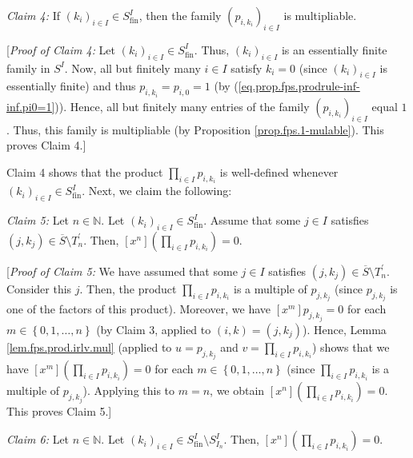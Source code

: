\begin{statement}
\textit{Claim 4:} If $\left(  k_{i}\right)  _{i\in I}\in
S_{\operatorname*{fin}}^{I}$, then the family $\left(  p_{i,k_{i}}\right)
_{i\in I}$ is multipliable.
\end{statement}

[\textit{Proof of Claim 4:} Let $\left(  k_{i}\right)  _{i\in I}\in
S_{\operatorname*{fin}}^{I}$. Thus, $\left(  k_{i}\right)  _{i\in I}$ is an
essentially finite family in $S^{I}$. Now, all but finitely many $i\in I$
satisfy $k_{i}=0$ (since $\left(  k_{i}\right)  _{i\in I}$ is essentially
finite) and thus $p_{i,k_{i}}=p_{i,0}=1$ (by
(\ref{eq.prop.fps.prodrule-inf-inf.pi0=1})). Hence, all but finitely many
entries of the family $\left(  p_{i,k_{i}}\right)  _{i\in I}$ equal $1$. Thus,
this family is multipliable (by Proposition \ref{prop.fps.1-mulable}). This
proves Claim 4.]

Claim 4 shows that the product $\prod_{i\in I}p_{i,k_{i}}$ is well-defined
whenever $\left(  k_{i}\right)  _{i\in I}\in S_{\operatorname*{fin}}^{I}$.
Next, we claim the following:

\begin{statement}
\textit{Claim 5:} Let $n\in\mathbb{N}$. Let $\left(  k_{i}\right)  _{i\in
I}\in S_{\operatorname*{fin}}^{I}$. Assume that some $j\in I$ satisfies
$\left(  j,k_{j}\right)  \in\overline{S}\setminus T_{n}^{\prime}$. Then,
$\left[  x^{n}\right]  \left(  \prod_{i\in I}p_{i,k_{i}}\right)  =0$.
\end{statement}

[\textit{Proof of Claim 5:} We have assumed that some $j\in I$ satisfies
$\left(  j,k_{j}\right)  \in\overline{S}\setminus T_{n}^{\prime}$. Consider
this $j$. Then, the product $\prod_{i\in I}p_{i,k_{i}}$ is a multiple of
$p_{j,k_{j}}$ (since $p_{j,k_{j}}$ is one of the factors of this product).
Moreover, we have $\left[  x^{m}\right]  p_{j,k_{j}}=0$ for each $m\in\left\{
0,1,\ldots,n\right\}  $ (by Claim 3, applied to $\left(  i,k\right)  =\left(
j,k_{j}\right)  $). Hence, Lemma \ref{lem.fps.prod.irlv.mul} (applied to
$u=p_{j,k_{j}}$ and $v=\prod_{i\in I}p_{i,k_{i}}$) shows that we have $\left[
x^{m}\right]  \left(  \prod_{i\in I}p_{i,k_{i}}\right)  =0$ for each
$m\in\left\{  0,1,\ldots,n\right\}  $ (since $\prod_{i\in I}p_{i,k_{i}}$ is a
multiple of $p_{j,k_{j}}$). Applying this to $m=n$, we obtain $\left[
x^{n}\right]  \left(  \prod_{i\in I}p_{i,k_{i}}\right)  =0$. This proves Claim 5.]

\begin{statement}
\textit{Claim 6:} Let $n\in\mathbb{N}$. Let $\left(  k_{i}\right)  _{i\in
I}\in S_{\operatorname*{fin}}^{I}\setminus S_{I_{n}}^{I}$. Then, $\left[
x^{n}\right]  \left(  \prod_{i\in I}p_{i,k_{i}}\right)  =0$.
\end{statement}

